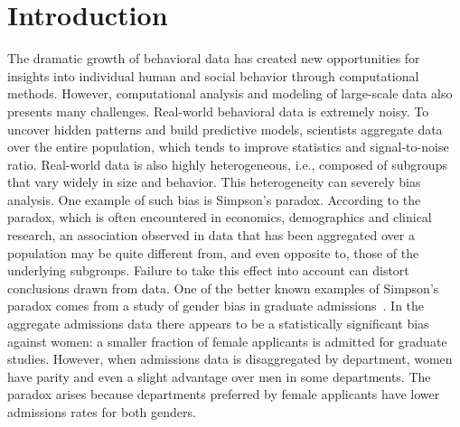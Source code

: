 \section{Introduction}
%

The dramatic growth of behavioral data has created new opportunities for insights into individual human and social behavior through computational methods. However, computational analysis and modeling of large-scale data also presents many challenges. Real-world behavioral data is extremely noisy. To uncover hidden patterns and build predictive models, scientists aggregate data over the entire population, which tends to improve statistics and signal-to-noise ratio. Real-world data is also highly heterogeneous, i.e., composed of subgroups that vary widely in size and behavior. This heterogeneity can severely bias analysis. %
One example of such bias is Simpson's paradox. According to the paradox, which is often encountered in economics, demographics and clinical research, an association observed in data that has been aggregated over a population may be quite different from, and even opposite to, those of the underlying subgroups. Failure to take this effect into account can distort conclusions drawn from data.
One of the better known examples of Simpson's paradox comes from a study of gender bias in graduate admissions~\cite{Bickel1975}. In the aggregate admissions data there appears to be a statistically significant bias against women: a smaller fraction of female applicants is admitted for graduate studies. However, when admissions data is disaggregated by department, women have parity and even a slight advantage over men in some departments. The paradox arises because departments preferred by female applicants have lower admissions rates for both genders.


